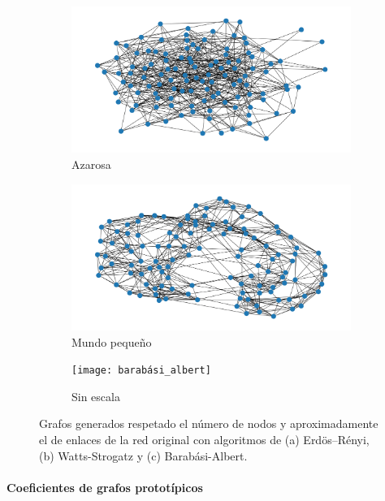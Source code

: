 \documentclass{article}
\begin{document}
\begin{figure}[ht]
	\centering
	\begin{subfigure}[b]{0.32\textwidth}
		\includegraphics[width= \linewidth]{erdos_renyi}
		\caption{Azarosa}
		\label{fg:erdos_renyi}
	\end{subfigure}
	\begin{subfigure}[b]{0.32\textwidth}
		\includegraphics[width= \linewidth]{watts_strogatz}
		\caption{Mundo pequeño}
		\label{fg:watts_strogatz}
	\end{subfigure}
	\begin{subfigure}[b]{0.32\textwidth}
		\texttt{[image: barabási\_albert]}
		\caption{Sin escala}
		\label{fg:barabási_albert}
	\end{subfigure}
	\caption{Grafos generados respetado el número de nodos y aproximadamente el de enlaces de la red original con algoritmos de (a) Erdös–Rényi, (b) Watts-Strogatz y (c) Barabási-Albert.}
	\label{fg:prototípicas}
\end{figure}



\paragraph{Coeficientes de grafos prototípicos}
\end{document}
